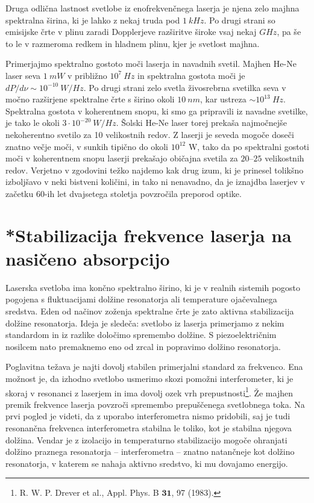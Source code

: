 Druga odlična lastnost svetlobe iz enofrekvenčnega laserja je njena zelo majhna
spektralna širina, ki je lahko z nekaj truda pod $1~\si{kHz}$. Po drugi strani so emisijske 
črte v plinu zaradi Dopplerjeve razširitve široke vsaj nekaj $\si{GHz}$, 
pa še to le v razmeroma redkem in hladnem plinu, kjer je svetlost majhna.

Primerjajmo spektralno gostoto moči laserja in navadnih svetil. Majhen He-Ne
laser seva $1~\si{mW}$ v približno $10^{7}~\si{Hz}$ in spektralna gostota
moči je $dP/d\nu \sim 10^{-10}~\si{W/Hz}$. Po drugi strani zelo svetla 
živosrebrna svetilka seva v močno razširjene spektralne črte s širino okoli 
$10~\si{nm}$, kar ustreza $\sim 10^{13}~\si{Hz}$. 
Spektralna gostota v koherentnem snopu, ki smo ga pripravili iz
navadne svetilke, je tako le okoli $3\cdot 10^{-20}~\si{W/Hz}$. Šolski
He-Ne laser torej prekaša najmočnejše nekoherentno svetilo za 10
velikostnih redov. Z laserji je seveda mogoče doseči znatno večje
moči, v sunkih tipično do okoli $10^{12}$ W, tako da po spektralni gostoti moči v
koherentnem snopu laserji prekašajo običajna svetila za $20$--$25$
velikostnih redov. Verjetno v zgodovini težko najdemo kak drug izum, 
ki je prinesel tolikšno izboljšavo v neki bistveni količini, in tako ni 
nenavadno, da je iznajdba laserjev v začetku 60-ih let dvajsetega stoletja povzročila preporod optike.

\section{*Stabilizacija frekvence laserja na nasičeno absorpcijo}
\label{chap:stabilizacija}
Laserska svetloba ima končno spektralno širino, ki 
je v realnih sistemih pogosto pogojena s fluktuacijami dolžine resonatorja ali 
temperature ojačevalnega sredstva. Eden od načinov 
zoženja spektralne črte je zato aktivna stabilizacija
dolžine resonatorja. Ideja je sledeča: svetlobo iz laserja primerjamo
z nekim standardom in iz razlike določimo spremembo dolžine. S
piezoelektričnim nosilcem nato premaknemo eno od zrcal in popravimo 
dolžino resonatorja. 

Poglavitna težava je najti dovolj stabilen primerjalni standard za frekvenco. 
Ena možnost je, da izhodno svetlobo usmerimo skozi pomožni 
interferometer, 
ki je skoraj v resonanci z laserjem in ima dovolj ozek vrh 
prepustnosti\footnote{R. W. P. Drever et al., Appl. Phys. B $\mathbf{31}$, 97 (1983).}.
Že majhen 
premik frekvence laserja povzroči spremembo prepuščenega svetlobnega toka. 
Na prvi pogled je videti, da z uporabo interferometra nismo pridobili, 
saj je tudi resonančna frekvenca interferometra stabilna le toliko, kot je 
stabilna njegova dolžina. Vendar je z izolacijo in temperaturno stabilizacijo 
mogoče ohranjati dolžino praznega resonatorja -- interferometra -- znatno
natančneje kot dolžino resonatorja, v katerem se nahaja aktivno sredstvo, ki mu 
dovajamo energijo.

